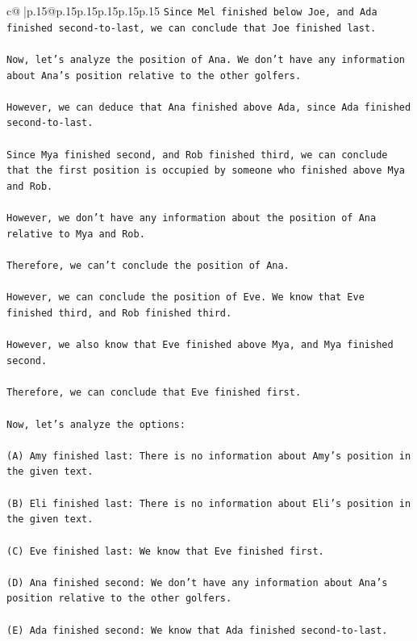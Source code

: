 \documentclass{article}
\begin{document}
{\begin{supertabular}{c@{$\;$}|p{.15\linewidth}@{}p{.15\linewidth}p{.15\linewidth}p{.15\linewidth}p{.15\linewidth}p{.15\linewidth}}
{{{\texttt{Since Mel finished below Joe, and Ada finished second{-}to{-}last, we can conclude that Joe finished last.} \\
\\ 
\texttt{Now, let's analyze the position of Ana. We don't have any information about Ana's position relative to the other golfers. } \\
\\ 
\texttt{However, we can deduce that Ana finished above Ada, since Ada finished second{-}to{-}last. } \\
\\ 
\texttt{Since Mya finished second, and Rob finished third, we can conclude that the first position is occupied by someone who finished above Mya and Rob. } \\
\\ 
\texttt{However, we don't have any information about the position of Ana relative to Mya and Rob. } \\
\\ 
\texttt{Therefore, we can't conclude the position of Ana.} \\
\\ 
\texttt{However, we can conclude the position of Eve. We know that Eve finished third, and Rob finished third. } \\
\\ 
\texttt{However, we also know that Eve finished above Mya, and Mya finished second. } \\
\\ 
\texttt{Therefore, we can conclude that Eve finished first.} \\
\\ 
\texttt{Now, let's analyze the options:} \\
\\ 
\texttt{(A) Amy finished last: There is no information about Amy's position in the given text.} \\
\\ 
\texttt{(B) Eli finished last: There is no information about Eli's position in the given text.} \\
\\ 
\texttt{(C) Eve finished last: We know that Eve finished first.} \\
\\ 
\texttt{(D) Ana finished second: We don't have any information about Ana's position relative to the other golfers.} \\
\\ 
\texttt{(E) Ada finished second: We know that Ada finished second{-}to{-}last.} \\
}}}
\end{supertabular}}
\end{document}
